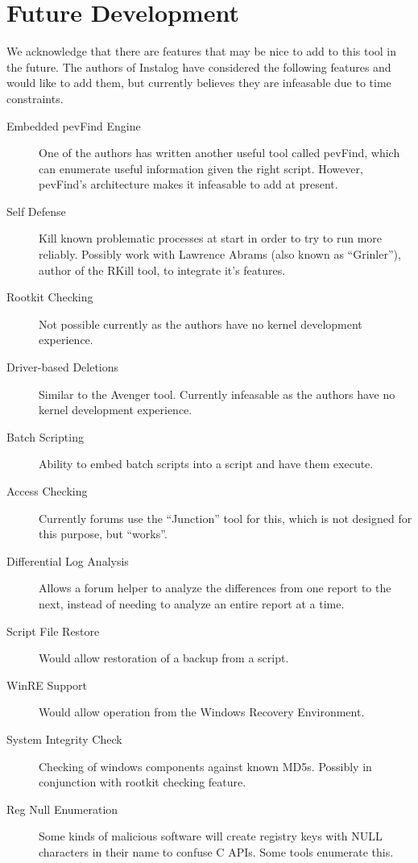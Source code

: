 \section{Future Development}
We acknowledge that there are features that may be nice to add to this tool in
the future. The authors of Instalog have considered the following features and
would like to add them, but currently believes they are infeasable due to time
constraints.
\begin{description}
\item[Embedded pevFind Engine] One of the authors has written another useful
tool called pevFind, which can enumerate useful information given the right
script. However, pevFind's architecture makes it infeasable to add at present.
\item[Self Defense] Kill known problematic processes at start in order to try to
run more reliably. Possibly work with Lawrence Abrams (also known as
``Grinler''), author of the RKill tool, to integrate it's features.
\item[Rootkit Checking] Not possible currently as the authors have no kernel
development experience.
\item[Driver-based Deletions] Similar to the Avenger tool. Currently infeasable
as the authors have no kernel development experience.
\item[Batch Scripting] Ability to embed batch scripts into a script and have
them execute.
\item[Access Checking] Currently forums use the ``Junction'' tool for this,
which is not designed for this purpose, but ``works''.
\item[Differential Log Analysis] Allows a forum helper to analyze the
differences from one report to the next, instead of needing to analyze an entire
report at a time.
\item[Script File Restore] Would allow restoration of a backup from a script.
\item[WinRE Support] Would allow operation from the Windows Recovery
Environment.
\item[System Integrity Check] Checking of windows components against known
MD5s. Possibly in conjunction with rootkit checking feature.
\item[Reg Null Enumeration] Some kinds of malicious software will create
registry keys with NULL characters in their name to confuse C APIs. Some tools
enumerate this.
\end{description}
